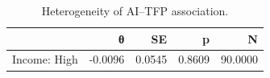 \begin{table}[t]
\centering\small
\begin{tabular}{lrrrr}
\toprule
 & θ & SE & p & N \\
\midrule
Income: High & -0.0096 & 0.0545 & 0.8609 & 90.0000 \\
\bottomrule
\end{tabular}
\caption{Heterogeneity of AI--TFP association.}
\label{tab:het}
\end{table}